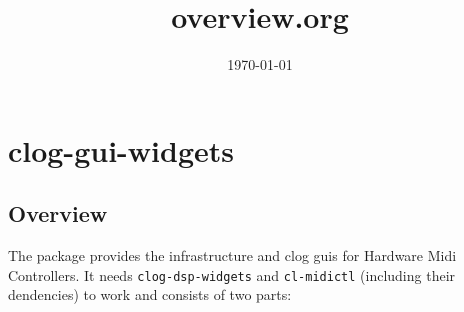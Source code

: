 \documentclass[a4paper]{article}
\date{\today}
\title{overview.org}
\begin{document}
\maketitle
\setlength\parindent{0pt}


\section{clog-gui-widgets}
\label{sec:orga20417f}

\subsection{Overview}
\label{sec:org695d911}
The package provides the infrastructure and clog guis for Hardware
Midi Controllers. It needs \texttt{clog-dsp-widgets} and \texttt{cl-midictl}
(including their dendencies) to work and consists of two parts:
\end{document}

